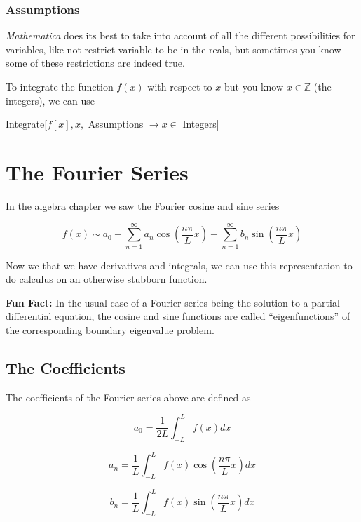 \documentclass[11pt,letterpaper,twoside,titlepage]{book}
\newcommand{\Mathematica}{\textit{Mathematica} }
\begin{document}
					\subsubsection{Assumptions}
					
						\Mathematica does its best to take into account of all the different possibilities for variables, like not restrict variable to be in the reals, but sometimes you know some of these restrictions are indeed true.  
						
						To integrate the function $f(x)$ with respect to $x$ but you know $x \in \mathbb{Z}$ (the integers), we can use
						
						\begin{center}
						
							Integrate[$f[x],x,$ Assumptions $\rightarrow x \in $ Integers]
						
						\end{center}
						
			\section{The Fourier Series}
			
				In the algebra chapter we saw the Fourier cosine and sine series
				
				\[ f(x) \sim a_0 + \sum_{n=1}^\infty a_n \cos \left(\frac{n \pi}{L} x \right) + \sum_{n=1}^\infty b_n \sin \left( \frac{n \pi}{L} x \right) \]
				
				Now we that we have derivatives and integrals, we can use this representation to do calculus on an otherwise stubborn function.  
				
				\textbf{Fun Fact:}  In the usual case of a Fourier series being the solution to a partial differential equation, the cosine and sine functions are called ``eigenfunctions'' of the corresponding boundary eigenvalue problem.
				
				\subsection{The Coefficients}
				
					The coefficients of the Fourier series above are defined as 
					
					\[ a_0 = \frac{1}{2L} \int_{-L}^L f(x) dx \]
					
					\[ a_n = \frac{1}{L} \int_{-L}^L f(x) \cos \left( \frac{n \pi}{L} x \right) dx \]
					
					\[ b_n = \frac{1}{L} \int_{-L}^L f(x) \sin \left( \frac{n \pi}{L} x \right) dx \]
					
\end{document}
